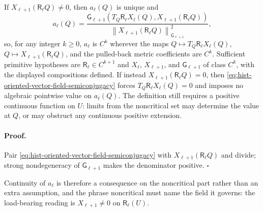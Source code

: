 If $X_{\ell+1}(\mathsf R_\ell Q)\ne0$, then $a_\ell(Q)$ is unique and
\begin{equation}
a_\ell(Q)
=\frac{\mathsf G_{\ell+1}
\left(T_Q\mathsf R_\ell X_\ell(Q),X_{\ell+1}(\mathsf R_\ell Q)\right)}
{\left\lVert X_{\ell+1}(\mathsf R_\ell Q)\right\rVert^2_{\mathsf G_{\ell+1}}},
\label{eq:hist-semiconjugacy-factor-formula}
\end{equation}
so, for any integer $k\geq0$, $a_\ell$ is $C^k$ wherever the maps
$Q\mapsto T_Q\mathsf R_\ell X_\ell(Q)$,
$Q\mapsto X_{\ell+1}(\mathsf R_\ell Q)$, and the pulled-back metric
coefficients are $C^k$.  Sufficient primitive hypotheses are
$\mathsf R_\ell\in C^{k+1}$ and $X_\ell$, $X_{\ell+1}$, and
$\mathsf G_{\ell+1}$ of class $C^k$, with the displayed compositions defined.
If instead $X_{\ell+1}(\mathsf R_\ell Q)=0$,
then \eqref{eq:hist-oriented-vector-field-semiconjugacy} forces
$T_Q\mathsf R_\ell X_\ell(Q)=0$ and imposes no algebraic pointwise value on
$a_\ell(Q)$.  The definition still requires a positive continuous function
on $U$: limits from the noncritical set may determine the value at $Q$, or may
obstruct any continuous positive extension.

\paragraph{Proof.}
Pair \eqref{eq:hist-oriented-vector-field-semiconjugacy} with
$X_{\ell+1}(\mathsf R_\ell Q)$ and divide; strong nondegeneracy of
$\mathsf G_{\ell+1}$ makes the denominator positive.  $\square$

Continuity of $a_\ell$ is therefore a consequence on the noncritical part
rather than an extra assumption, and the phrase noncritical must name the field
it governs: the load-bearing reading is $X_{\ell+1}\ne0$ on
$\mathsf R_\ell(U)$.  

